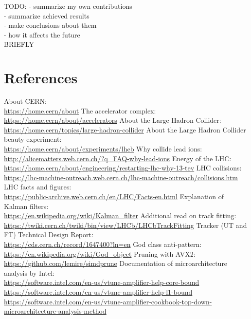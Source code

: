 \documentclass[12pt]{article}
\begin{document}
{
	\color{red}
	TODO:
	- summarize my own contributions \\
	- summarize achieved results \\
	- make conclusions about them \\
	- how it affects the future \\
	BRIEFLY
}


\newpage
\section{References}

\begin{thebibliography}{asd}
	 About CERN: \\
		\url{https://home.cern/about}
	 The accelerator complex: \\
		\url{https://home.cern/about/accelerators}
	 About the Large Hadron Collider: \\
		\url{https://home.cern/topics/large-hadron-collider}
	 About the Large Hadron Collider beauty experiment: \\
		\url{https://home.cern/about/experiments/lhcb}
	 Why collide lead ions: \\
		\url{http://alicematters.web.cern.ch/?q=FAQ-why-lead-ions}
	 Energy of the LHC: \\
		\url{https://home.cern/about/engineering/restarting-lhc-why-13-tev}
	 LHC collisions: \\
		\url{https://lhc-machine-outreach.web.cern.ch/lhc-machine-outreach/collisions.htm}
	 LHC facts and figures: \\
		\url{https://public-archive.web.cern.ch/en/LHC/Facts-en.html}
	 Explanation of Kalman filters: \\
		\url{https://en.wikipedia.org/wiki/Kalman_filter}
	 Additional read on track fitting: \\
		\url{https://twiki.cern.ch/twiki/bin/view/LHCb/LHCbTrackFitting}
	 Tracker (UT and FT) Technical Design Report: \\
		\url{https://cds.cern.ch/record/1647400?ln=en}
	 God class anti-pattern: \\
		\url{https://en.wikipedia.org/wiki/God_object}
	 Pruning with AVX2: \\
		\url{https://github.com/lemire/simdprune} 
	 Documentation of microarchitecture analysis by Intel: \\
		\url{https://software.intel.com/en-us/vtune-amplifier-help-core-bound}\\
		\url{https://software.intel.com/en-us/vtune-amplifier-help-l1-bound}\\
		\url{https://software.intel.com/en-us/vtune-amplifier-cookbook-top-down-microarchitecture-analysis-method}
\end{thebibliography}
\end{document}
